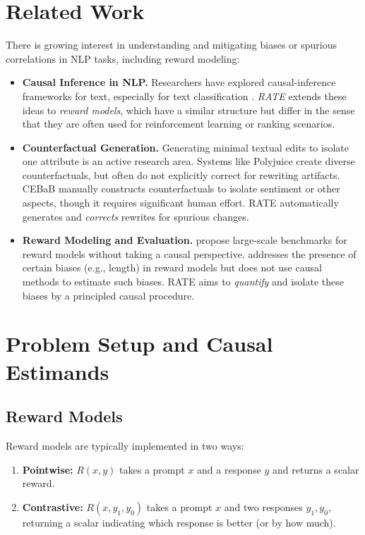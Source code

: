 \section{Related Work}
\label{sec:related_work}

There is growing interest in understanding and mitigating biases or spurious correlations in NLP tasks, including reward modeling:

\begin{itemize}
    \item \textbf{Causal Inference in NLP.} Researchers have explored causal-inference frameworks for text, especially for text classification \cite{feder2022causalinferencenaturallanguage}. \emph{RATE} extends these ideas to \emph{reward models}, which have a similar structure but differ in the sense that they are often used for reinforcement learning or ranking scenarios.
    \item \textbf{Counterfactual Generation.} Generating minimal textual edits to isolate one attribute is an active research area. Systems like Polyjuice \cite{wu2021polyjuicegeneratingcounterfactualsexplaining} create diverse counterfactuals, but often do not explicitly correct for rewriting artifacts. CEBaB \cite{abraham2022cebab} manually constructs counterfactuals to isolate sentiment or other aspects, though it requires significant human effort. RATE automatically generates and \emph{corrects} rewrites for spurious changes.
    \item \textbf{Reward Modeling and Evaluation.} \cite{lambert2024rewardbenchevaluatingrewardmodels} propose large-scale benchmarks for reward models without taking a causal perspective. \cite{park2024offsetbias} addresses the presence of certain biases (e.g., length) in reward models but does not use causal methods to estimate such biases. RATE aims to \emph{quantify} and isolate these biases by a principled causal procedure.
\end{itemize}

\section{Problem Setup and Causal Estimands}
\label{sec:setup}
\subsection{Reward Models}
Reward models are typically implemented in two ways:
\begin{enumerate}
\item \textbf{Pointwise:} $R(x, y)$ takes a prompt $x$ and a response $y$ and returns a scalar reward.
\item \textbf{Contrastive:} $R(x, y_1, y_0)$ takes a prompt $x$ and two responses $y_1, y_0$, returning a scalar indicating which response is better (or by how much).
\end{enumerate}

